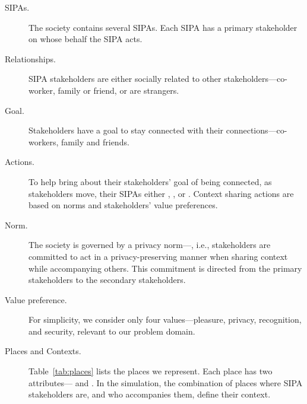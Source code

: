 \begin{description}

\item[SIPAs.] The society contains several SIPAs. Each SIPA has a primary stakeholder on whose behalf the SIPA acts.  

\item[Relationships.] SIPA stakeholders are either socially related to other stakeholders---co-worker, family or friend, or are strangers. 

\item[Goal.] Stakeholders have a goal to stay connected with their connections---co-workers, family and friends. 


\item[Actions.] To help bring about their stakeholders' goal of being connected, as stakeholders move, their SIPAs either , , or . Context sharing actions are based on norms and stakeholders' value preferences.

\item[Norm.] The society is governed by a privacy norm---, i.e., stakeholders are committed to act in a privacy-preserving manner when sharing context while accompanying others. This commitment is directed from the primary stakeholders to the secondary stakeholders.  

\item[Value preference.] For simplicity, we consider only four values---pleasure, privacy, recognition, and security, relevant to our problem domain.  

\item[Places and Contexts.]

Table~\ref{tab:places} lists the places we represent. Each place has two attributes--- and . In the simulation, the combination of places where SIPA stakeholders are, and who accompanies them, define their context.


\end{description}
